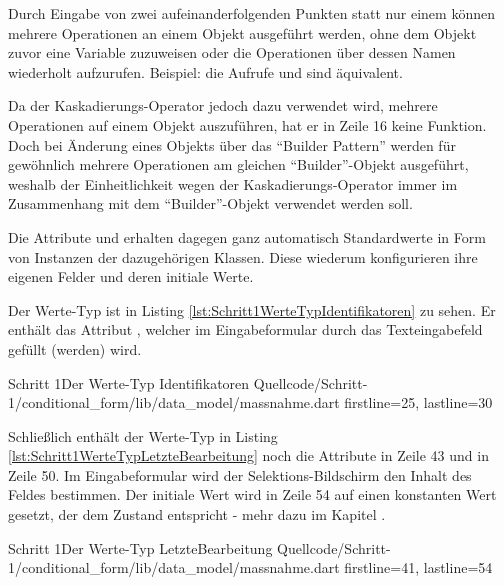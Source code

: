 Durch Eingabe von zwei aufeinanderfolgenden Punkten  statt nur einem  können mehrere Operationen an einem Objekt ausgeführt werden, ohne  dem Objekt zuvor eine Variable zuzuweisen oder die Operationen über dessen Namen wiederholt aufzurufen. Beispiel: die Aufrufe   und  sind äquivalent.

Da der Kaskadierungs-Operator jedoch dazu verwendet wird, mehrere Operationen auf einem Objekt auszuführen, hat er in Zeile 16 keine Funktion.
Doch bei Änderung eines Objekts über das \enquote{Builder Pattern} werden für gewöhnlich mehrere Operationen am gleichen \enquote{Builder}-Objekt ausgeführt, weshalb der Einheitlichkeit wegen der Kaskadierungs-Operator immer im Zusammenhang mit dem \enquote{Builder}-Objekt verwendet werden soll.

Die Attribute  und   erhalten dagegen ganz automatisch Standardwerte in Form von Instanzen der dazugehörigen Klassen.
Diese wiederum konfigurieren ihre eigenen Felder und deren initiale Werte.



Der Werte-Typ  ist in Listing \ref{lst:Schritt1WerteTypIdentifikatoren} zu sehen.
Er enthält das Attribut , welcher im Eingabeformular durch das Texteingabefeld gefüllt (werden) wird.

\begin{alexlisting}{Schritt 1}{Der Werte-Typ Identifikatoren}
  {Quellcode/Schritt-1/conditional_form/lib/data_model/massnahme.dart}
  {firstline=25, lastline=30}
  \label{lst:Schritt1WerteTypIdentifikatoren}
\end{alexlisting}

Schließlich enthält der Werte-Typ  in Listing \ref{lst:Schritt1WerteTypLetzteBearbeitung} noch die Attribute  in Zeile 43 und  in Zeile 50.
Im Eingabeformular wird der Selektions-Bildschirm den Inhalt des Feldes  bestimmen.
Der initiale Wert wird in Zeile 54 auf einen konstanten Wert gesetzt, der dem Zustand  entspricht - mehr dazu im Kapitel .

\begin{alexlisting}{Schritt 1}{Der Werte-Typ LetzteBearbeitung}
  {Quellcode/Schritt-1/conditional_form/lib/data_model/massnahme.dart}
  {firstline=41, lastline=54}
  \label{lst:Schritt1WerteTypLetzteBearbeitung}
\end{alexlisting}

